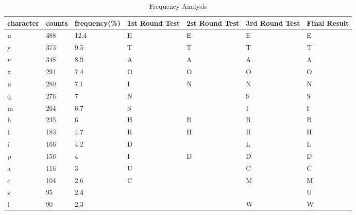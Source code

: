 \begin{table}[hbt] \centering\caption{Frequency Analysis}\label{table:task1}
    \begin{tabular}{|l|l|l|l|l|l|l|}
        \hline
        character & counts & frequency(\%) & 1st Round Test & 2st Round Test & 3rd Round Test & Final Result \\ \hline
        n         & 488    & 12.4          & E              & E              & E              & E            \\ \hline
        y         & 373    & 9.5           & T              & T              & T              & T            \\ \hline
        v         & 348    & 8.9           & A              & A              & A              & A            \\ \hline
        x         & 291    & 7.4           & O              & O              & O              & O            \\ \hline
        u         & 280    & 7.1           & I              & N              & N              & N            \\ \hline
        q         & 276    & 7             & N              &                & S              & S            \\ \hline
        m         & 264    & 6.7           & S              &                & I              & I            \\ \hline
        h         & 235    & 6             & H              & R              & R              & R            \\ \hline
        t         & 183    & 4.7           & R              & H              & H              & H            \\ \hline
        i         & 166    & 4.2           & D              &                & L              & L            \\ \hline
        p         & 156    & 4             & I              & D              & D              & D            \\ \hline
        a         & 116    & 3             & U              &                & C              & C            \\ \hline
        c         & 104    & 2.6           & C              &                & M              & M            \\ \hline
        z         & 95     & 2.4           &                &                &                & U            \\ \hline
        l         & 90     & 2.3           &                &                & W              & W            \\ \hline

\end{tabular}
\end{table}
